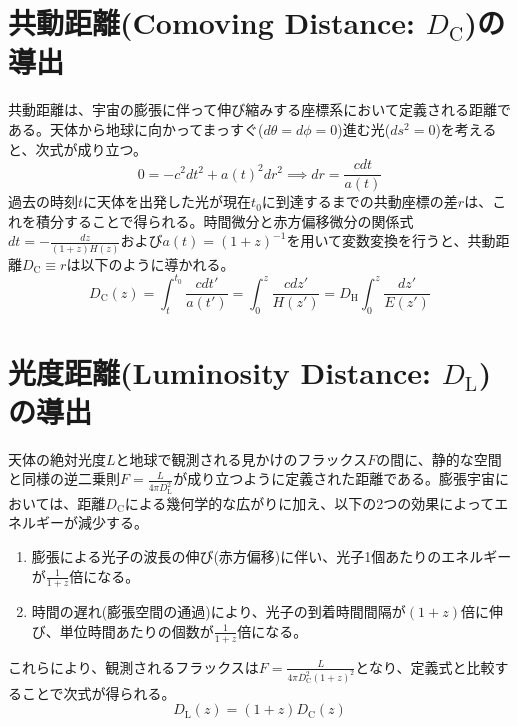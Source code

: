 \documentclass[dvipdfmx]{jlreq}
\begin{document}
\section{共動距離(Comoving Distance: $D_{\mathrm{C}}$)の導出}
共動距離は、宇宙の膨張に伴って伸び縮みする座標系において定義される距離である。天体から地球に向かってまっすぐ($d\theta = d\phi = 0$)進む光($ds^2 = 0$)を考えると、次式が成り立つ。
\begin{equation}
    0 = -c^2 dt^2 + a(t)^2 dr^2 \implies dr = \frac{c dt}{a(t)}
\end{equation}
過去の時刻$t$に天体を出発した光が現在$t_0$に到達するまでの共動座標の差$r$は、これを積分することで得られる。時間微分と赤方偏移微分の関係式$dt = -\frac{dz}{(1+z)H(z)}$および$a(t) = (1+z)^{-1}$を用いて変数変換を行うと、共動距離$D_{\mathrm{C}} \equiv r$は以下のように導かれる。
\begin{equation}
    D_{\mathrm{C}}(z) = \int_{t}^{t_0} \frac{c dt'}{a(t')} = \int_{0}^{z} \frac{c dz'}{H(z')} = D_{\mathrm{H}} \int_{0}^{z} \frac{dz'}{E(z')}
\end{equation}

\section{光度距離(Luminosity Distance: $D_{\mathrm{L}}$)の導出}
天体の絶対光度$L$と地球で観測される見かけのフラックス$F$の間に、静的な空間と同様の逆二乗則$F = \frac{L}{4\pi D_{\mathrm{L}}^2}$が成り立つように定義された距離である。膨張宇宙においては、距離$D_{\mathrm{C}}$による幾何学的な広がりに加え、以下の2つの効果によってエネルギーが減少する。
\begin{enumerate}
    \item 膨張による光子の波長の伸び(赤方偏移)に伴い、光子1個あたりのエネルギーが$\frac{1}{1+z}$倍になる。
    \item 時間の遅れ(膨張空間の通過)により、光子の到着時間間隔が$(1+z)$倍に伸び、単位時間あたりの個数が$\frac{1}{1+z}$倍になる。
\end{enumerate}
これらにより、観測されるフラックスは$F = \frac{L}{4\pi D_{\mathrm{C}}^2 (1+z)^2}$となり、定義式と比較することで次式が得られる。
\begin{equation}
    D_{\mathrm{L}}(z) = (1+z)D_{\mathrm{C}}(z)
\end{equation}
\end{document}

